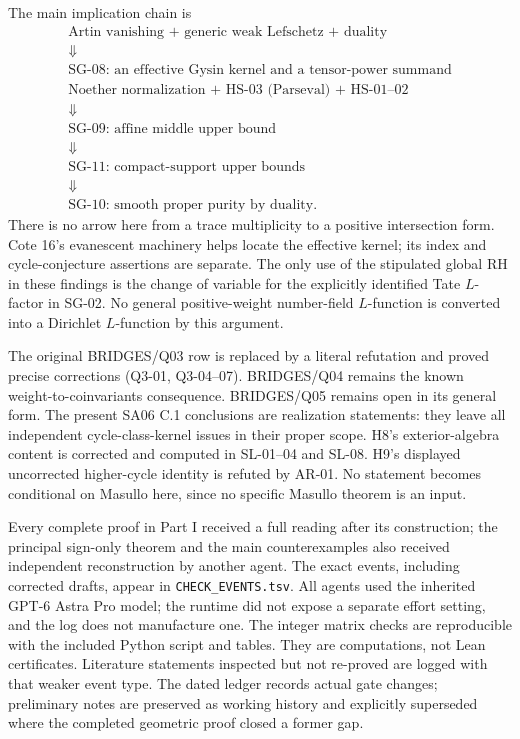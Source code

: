 The main implication chain is
\[
 \begin{gathered}
 \text{Artin vanishing + generic weak Lefschetz + duality}\\
 \Downarrow\\
 \text{SG-08: an effective Gysin kernel and a tensor-power summand}\\
 \text{Noether normalization + HS-03 (Parseval) + HS-01--02}\\
 \Downarrow\\
 \text{SG-09: affine middle upper bound}\\
 \Downarrow\\
 \text{SG-11: compact-support upper bounds}\\
 \Downarrow\\
 \text{SG-10: smooth proper purity by duality.}
 \end{gathered}
\]
There is no arrow here from a trace multiplicity to a positive
intersection form.  Cote 16's evanescent machinery helps locate the
effective kernel; its index and cycle-conjecture assertions are separate.
The only use of the stipulated global RH in these findings is the
change of variable for the explicitly identified Tate $L$-factor in
SG-02.  No general positive-weight number-field $L$-function is converted
into a Dirichlet $L$-function by this argument.

The original BRIDGES/Q03 row is replaced by a literal refutation and
proved precise corrections (Q3-01, Q3-04--07).  BRIDGES/Q04 remains the
known weight-to-coinvariants consequence.  BRIDGES/Q05 remains open in
its general form.  The present SA06 C.1 conclusions are realization
statements: they leave all independent cycle-class-kernel issues in
their proper scope.  H8's exterior-algebra content is corrected and
computed in SL-01--04 and SL-08.  H9's displayed uncorrected higher-cycle
identity is refuted by AR-01.  No statement becomes conditional on
Masullo here, since no specific Masullo theorem is an input.

Every complete proof in Part I received a full reading after its
construction; the principal sign-only theorem and the main counterexamples
also received independent reconstruction by another agent.  The exact
events, including corrected drafts, appear in \texttt{CHECK\_EVENTS.tsv}.
All agents used the inherited GPT-6 Astra Pro model; the runtime did not
expose a separate effort setting, and the log does not manufacture one.
The integer matrix checks are reproducible with the included Python
script and tables.  They are computations, not Lean certificates.
Literature statements inspected but not re-proved are logged with that
weaker event type.  The dated ledger records actual gate changes;
preliminary notes are preserved as working history and explicitly
superseded where the completed geometric proof closed a former gap.


